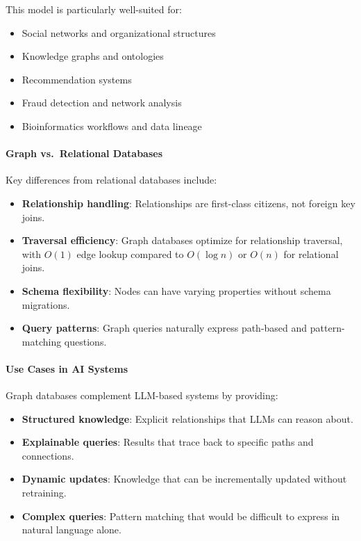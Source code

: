 \documentclass[a4paper,twoside]{sapthesis}
\begin{document}
This model is particularly well-suited for:
\begin{itemize}
    \item Social networks and organizational structures
    \item Knowledge graphs and ontologies
    \item Recommendation systems
    \item Fraud detection and network analysis
    \item Bioinformatics workflows and data lineage
\end{itemize}

\paragraph{Graph vs.\ Relational Databases}

Key differences from relational databases include:

\begin{itemize}
    \item \textbf{Relationship handling}: Relationships are first-class citizens, not foreign key joins.
    \item \textbf{Traversal efficiency}: Graph databases optimize for relationship traversal, with $O(1)$ edge lookup compared to $O(\log n)$ or $O(n)$ for relational joins.
    \item \textbf{Schema flexibility}: Nodes can have varying properties without schema migrations.
    \item \textbf{Query patterns}: Graph queries naturally express path-based and pattern-matching questions.
\end{itemize}

\paragraph{Use Cases in AI Systems}

Graph databases complement LLM-based systems by providing:
\begin{itemize}
    \item \textbf{Structured knowledge}: Explicit relationships that LLMs can reason about.
    \item \textbf{Explainable queries}: Results that trace back to specific paths and connections.
    \item \textbf{Dynamic updates}: Knowledge that can be incrementally updated without retraining.
    \item \textbf{Complex queries}: Pattern matching that would be difficult to express in natural language alone.
\end{itemize}
\end{document}
